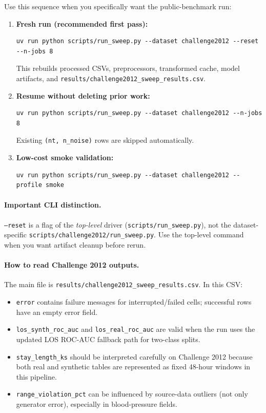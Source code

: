Use this sequence when you specifically want the public-benchmark run:
\begin{enumerate}\tightlist
    \item \textbf{Fresh run (recommended first pass):}
    \begin{verbatim}
uv run python scripts/run_sweep.py --dataset challenge2012 --reset --n-jobs 8
    \end{verbatim}
    This rebuilds processed CSVs, preprocessors, transformed cache, model artifacts, and
    \texttt{results/challenge2012\_sweep\_results.csv}.
    \item \textbf{Resume without deleting prior work:}
    \begin{verbatim}
uv run python scripts/run_sweep.py --dataset challenge2012 --n-jobs 8
    \end{verbatim}
    Existing \texttt{(nt, n\_noise)} rows are skipped automatically.
    \item \textbf{Low-cost smoke validation:}
    \begin{verbatim}
uv run python scripts/run_sweep.py --dataset challenge2012 --profile smoke
    \end{verbatim}
\end{enumerate}

\paragraph{Important CLI distinction.}
\texttt{--reset} is a flag of the \emph{top-level} driver
(\texttt{scripts/run\_sweep.py}), not the dataset-specific
\texttt{scripts/challenge2012/run\_sweep.py}. Use the top-level command when
you want artifact cleanup before rerun.

\paragraph{How to read Challenge 2012 outputs.}
The main file is \texttt{results/challenge2012\_sweep\_results.csv}. In this
CSV:
\begin{itemize}\tightlist
    \item \texttt{error} contains failure messages for interrupted/failed cells; successful rows have an empty error field.
    \item \texttt{los\_synth\_roc\_auc} and \texttt{los\_real\_roc\_auc} are valid when the run uses the updated LOS ROC-AUC fallback path for two-class splits.
    \item \texttt{stay\_length\_ks} should be interpreted carefully on Challenge 2012 because both real and synthetic tables are represented as fixed 48-hour windows in this pipeline.
    \item \texttt{range\_violation\_pct} can be influenced by source-data outliers (not only generator error), especially in blood-pressure fields.
\end{itemize}

